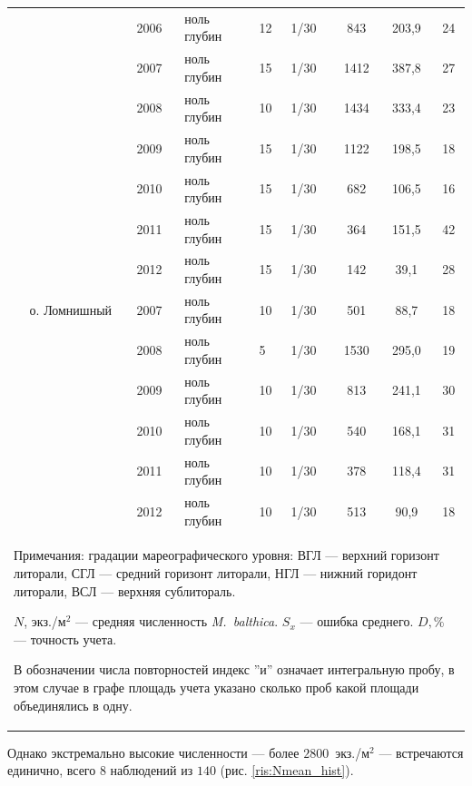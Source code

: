 \begin{footnotesize}
\begin{center}
\begin{longtable}{|p{1.6cm}|p{2.3cm}|p{1cm}|p{2cm}|p{1.5cm}|p{1.3cm}|*{3}{c|}}
		 &  & 2006 & ноль глубин & 12 & 1/30 & 843 & 203,9 & 24
		\\ \cline{3-9}
		 &  & 2007 & ноль глубин & 15 & 1/30 & 1412 & 387,8 & 27
		\\ \cline{3-9}
		 &  & 2008 & ноль глубин & 10 & 1/30 & 1434 & 333,4 & 23
		\\ \cline{3-9}
		 &  & 2009 & ноль глубин & 15 & 1/30 & 1122 & 198,5 & 18
		\\ \cline{3-9}
		 &  & 2010 & ноль глубин & 15 & 1/30 & 682 & 106,5 & 16
		\\ \cline{3-9}
		 &  & 2011 & ноль глубин & 15 & 1/30 & 364 & 151,5 & 42
		\\ \cline{3-9}
		 &  & 2012 & ноль глубин & 15 & 1/30 & 142 & 39,1 & 28
		\\ \cline{2-9}
	 & о. Ломнишный & 2007 & ноль глубин & 10 & 1/30 & 501 & 88,7 & 18
		\\ \cline{3-9}
		 &  & 2008 & ноль глубин & 5 & 1/30 & 1530 & 295,0 & 19
		\\ \cline{3-9}
		 &  & 2009 & ноль глубин & 10 & 1/30 & 813 & 241,1 & 30
	\\ \cline{3-9}
	 &  & 2010 & ноль глубин & 10 & 1/30 & 540 & 168,1 & 31
	\\ \cline{3-9}
	 &  & 2011 & ноль глубин & 10 & 1/30 & 378 & 118,4 & 31
	\\ \cline{3-9}
	 &  & 2012 & ноль глубин & 10 & 1/30 & 513 & 90,9 & 18
	\\ \hline
	\multicolumn{9}{p{16cm}}{Примечания: градации мареографического уровня: ВГЛ --- верхний горизонт литорали, СГЛ --- средний горизонт литорали, НГЛ --- нижний горидонт литорали, ВСЛ --- верхняя сублитораль. 

	$N$, экз./м$^2$ --- средняя численность {\it M.~balthica}. 
	$S_x$ --- ошибка среднего.
	 $D, \%$ ---  точность учета.

	В обозначении числа повторностей индекс ''и'' означает интегральную пробу, в этом случае в графе площадь учета указано сколько проб какой площади объединялись в одну.}
	\end{longtable}
\end{center}
	\end{footnotesize}
%
Однако экстремально высокие численности --- более $2800$~экз./м$^2$ --- встречаются единично, всего $8$ наблюдений из $140$ (рис. \ref{ris:Nmean_hist}).
%
